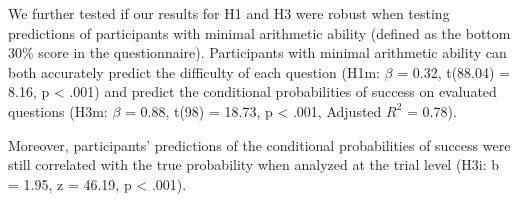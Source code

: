 \documentclass[
  10pt,
  letterpaper]{article}
\begin{document}
We further tested if our results for H1 and H3 were robust when testing predictions of participants with minimal arithmetic ability (defined as the bottom 30\% score in the questionnaire). Participants with minimal arithmetic ability can both accurately predict the difficulty of each question (H1m: \(\beta\) = 0.32, t(88.04) = 8.16, p \textless{} .001) and predict the conditional probabilities of success on evaluated questions (H3m: \(\beta\) = 0.88, t(98) = 18.73, p \textless{} .001, Adjusted \(R^2\) = 0.78).

Moreover, participants' predictions of the conditional probabilities of success were still correlated with the true probability when analyzed at the trial level (H3i: b = 1.95, z = 46.19, p \textless{} .001).

\printbibliography
\end{document}
